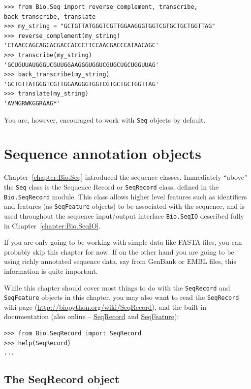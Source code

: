 \documentclass{report}
\begin{document}
\begin{verbatim}
>>> from Bio.Seq import reverse_complement, transcribe, back_transcribe, translate
>>> my_string = "GCTGTTATGGGTCGTTGGAAGGGTGGTCGTGCTGCTGGTTAG"
>>> reverse_complement(my_string)
'CTAACCAGCAGCACGACCACCCTTCCAACGACCCATAACAGC'
>>> transcribe(my_string)
'GCUGUUAUGGGUCGUUGGAAGGGUGGUCGUGCUGCUGGUUAG'
>>> back_transcribe(my_string)
'GCTGTTATGGGTCGTTGGAAGGGTGGTCGTGCTGCTGGTTAG'
>>> translate(my_string)
'AVMGRWKGGRAAG*'
\end{verbatim}

\noindent You are, however, encouraged to work with \verb|Seq| objects by default.

\chapter{Sequence annotation objects}
\label{chapter:SeqRecord}

Chapter~\ref{chapter:Bio.Seq} introduced the sequence classes.  Immediately ``above'' the \verb|Seq| class is the Sequence Record or \verb|SeqRecord| class, defined in the \verb|Bio.SeqRecord| module. This class allows higher level features such as identifiers and features (as \verb|SeqFeature| objects) to be associated with the sequence, and is used throughout the sequence input/output interface \verb|Bio.SeqIO| described fully in Chapter~\ref{chapter:Bio.SeqIO}.

If you are only going to be working with simple data like FASTA files, you can probably skip this chapter
for now. If on the other hand you are going to be using richly annotated sequence data, say from GenBank
or EMBL files, this information is quite important.

While this chapter should cover most things to do with the \verb|SeqRecord| and \verb|SeqFeature| objects in this chapter, you may also want to read the \verb|SeqRecord| wiki page (\url{http://biopython.org/wiki/SeqRecord}), and the built in documentation (also online -- \href{http://biopython.org/DIST/docs/api/Bio.SeqRecord.SeqRecord-class.html}{SeqRecord} and \href{http://biopython.org/DIST/docs/api/Bio.SeqFeature.SeqFeature-class.html}{SeqFeature}):

\begin{verbatim}
>>> from Bio.SeqRecord import SeqRecord
>>> help(SeqRecord)
...
\end{verbatim}

\section{The SeqRecord object}
\label{sec:SeqRecord}
\end{document}
